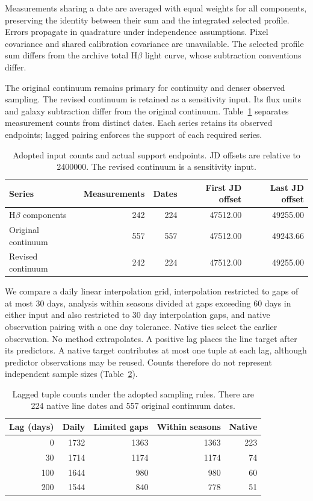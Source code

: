 \documentclass[fleqn,usenatbib]{mnras}
\begin{document}
Measurements sharing a date are averaged with equal weights for all components, preserving the identity between their sum and the integrated selected profile. Errors propagate in quadrature under independence assumptions. Pixel covariance and shared calibration covariance are unavailable. The selected profile sum differs from the archive total H$\beta$ light curve, whose subtraction conventions differ.

The original continuum remains primary for continuity and denser observed sampling. The revised continuum is retained as a sensitivity input. Its flux units and galaxy subtraction differ from the original continuum. Table~\ref{tab:adopted_inputs} separates measurement counts from distinct dates. Each series retains its observed endpoints; lagged pairing enforces the support of each required series.

\begin{table}
\centering
\begin{tabular}{lrrrr}
\hline
Series & Measurements & Dates & First JD offset & Last JD offset \\
\hline
H$\beta$ components & 242 & 224 & 47512.00 & 49255.00 \\
Original continuum & 557 & 557 & 47512.00 & 49243.66 \\
Revised continuum & 242 & 224 & 47512.00 & 49255.00 \\
\hline
\end{tabular}
\caption{Adopted input counts and actual support endpoints. JD offsets are relative to 2400000. The revised continuum is a sensitivity input.}
\label{tab:adopted_inputs}
\end{table}

We compare a daily linear interpolation grid, interpolation restricted to gaps of at most 30 days, analysis within seasons divided at gaps exceeding 60 days in either input and also restricted to 30 day interpolation gaps, and native observation pairing with a one day tolerance. Native ties select the earlier observation. No method extrapolates. A positive lag places the line target after its predictors. A native target contributes at most one tuple at each lag, although predictor observations may be reused. Counts therefore do not represent independent sample sizes (Table~\ref{tab:adopted_sampling_counts}).

\begin{table}
\centering
\begin{tabular}{rrrrr}
\hline
Lag (days) & Daily & Limited gaps & Within seasons & Native \\
\hline
0 & 1732 & 1363 & 1363 & 223 \\
30 & 1714 & 1174 & 1174 & 74 \\
100 & 1644 & 980 & 980 & 60 \\
200 & 1544 & 840 & 778 & 51 \\
\hline
\end{tabular}
\caption{Lagged tuple counts under the adopted sampling rules. There are 224 native line dates and 557 original continuum dates.}
\label{tab:adopted_sampling_counts}
\end{table}
\end{document}
